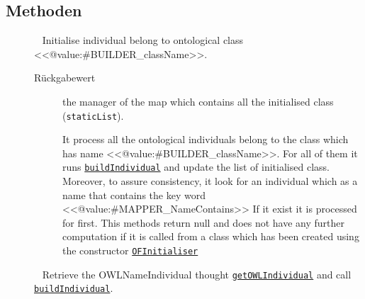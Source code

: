 \subsection{Methoden}
\begin{description}
\item[{\label{ontologyFramework.OFRunning.OFInitialising.OFInitialiser.initialise()}}]
~ Initialise individual belong to ontological class <<@value:#BUILDER\_className>>.
\begin{description}
\item[Rückgabewert] 
the manager of the map which contains all the initialised class (\texttt{staticList}).
 \par 
 It process all the ontological individuals belong to the class which has name <<@value:#BUILDER\_className>>.
 For all of them it runs \texttt{\hyperlink{ontologyFramework.OFRunning.OFInitialising.OFInitialiser.buildIndividual(org.semanticweb.owlapi.model.OWLNamedIndividual,ontologyFramework.OFContextManagement.OWLReferences)}{buildIndividual}}
 and update the list of initialised class. Moreover, to assure consistency, it
 look for an individual which as a name that contains the key word <<@value:#MAPPER\_NameContains>>
 If it exist it is processed for first. This methods return null and does not
 have any further computation if it is called from a class which has been created
 using the constructor \texttt{\hyperlink{ontologyFramework.OFRunning.OFInitialising.OFInitialiser()}{OFInitialiser}}
\end{description}
\item[{\label{ontologyFramework.OFRunning.OFInitialising.OFInitialiser.buildIndividual(java.lang.String,ontologyFramework.OFContextManagement.OWLReferences)}}]
~ Retrieve the OWLNameIndividual thought  \texttt{\hyperlink{ontologyFramework.OFContextManagement.OWLLibrary.getOWLIndividual(java.lang.String,ontologyFramework.OFContextManagement.OWLReferences)}{getOWLIndividual}}
 and call \texttt{\hyperlink{ontologyFramework.OFRunning.OFInitialising.OFInitialiser.buildIndividual(org.semanticweb.owlapi.model.OWLNamedIndividual,ontologyFramework.OFContextManagement.OWLReferences)}{buildIndividual}}.

\end{description}
